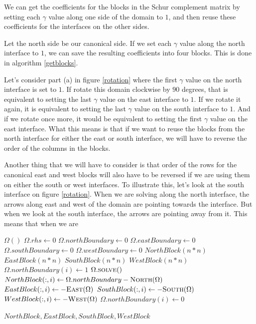 \documentclass[12pt]{article}
\begin{document}
We can get the coefficients for the blocks in the Schur complement matrix by
setting each $\gamma$ value along one side of the domain to $1$, and then reuse these coefficients 
for the interfaces on the other sides.

Let the north side be our canonical side. If we set each $\gamma$ value along the north interface to
$1$, we can save the resulting coefficients into four blocks. This is done in algorithm
\ref{getblocks}.

Let's consider part (a) in figure \ref{rotation} where the
first $\gamma$ value on the north interface is set to $1$. If rotate this domain clockwise by $90$
degrees, that is equivalent to setting the last $\gamma$ value on the east interface to $1$. If we
rotate it again, it is equivalent to setting the last $\gamma$ value on the south interface to
$1$. And if we rotate once more, it would be equivalent to setting the first $\gamma$ value on the
east interface. What this means is that if we want to reuse the blocks from the north interface 
for either the east or south interface, we will have to reverse the order of the columns in the 
blocks.

Another thing that we will have to consider is that order of the rows for the canonical east and
west blocks will also have to be reversed if we are using them on either the south or west
interfaces. To illustrate this, let's look at the south interface on figure \ref{rotation}. When we
are solving along the north interface, the arrows along east and west of the domain are pointing
towards the interface. But when we look at the south interface, the arrows are pointing away from
it. This means that when we are 


\begin{algorithm}
\caption{}
\label{getblocks}
\begin{algorithmic}[1]
    \State $\Omega()$ 
    \State $\Omega.rhs \gets 0$
    \State $\Omega.northBoundary \gets 0$
    \State $\Omega.eastBoundary \gets 0$
    \State $\Omega.southBoundary \gets 0$
    \State $\Omega.westBoundary \gets 0$
    \State $NorthBlock(n*n)$ 
    \State $EastBlock(n*n)$
    \State $SouthBlock(n*n)$
    \State $WestBlock(n*n)$
         \State $\Omega.northBoundary(i) \gets 1$
         \State $\Omega.\Call{solve}{ }$
         \State $NorthBlock(:,i) \gets \Omega.northBoundary - \Call{North}{\Omega}$
         \State $EastBlock(:,i) \gets -\Call{East}{\Omega}$
         \State $SouthBlock(:,i) \gets -\Call{South}{\Omega}$
         \State $WestBlock(:,i) \gets -\Call{West}{\Omega}$
         \State $\Omega.northBoundary(i) \gets 0$
    \EndFor

    \State \Return $NorthBlock, EastBlock, SouthBlock, WestBlock$
    \EndProcedure
\end{algorithmic}
\end{algorithm}
\end{document}
